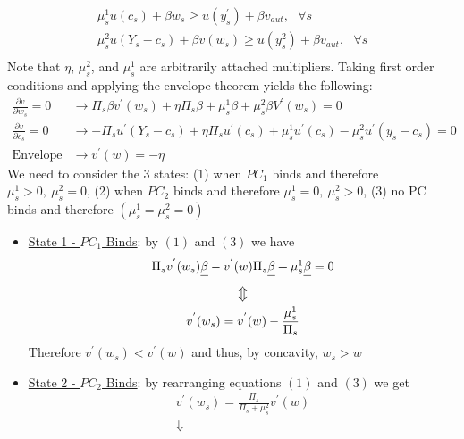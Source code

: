 \documentclass{article}
\begin{document}
\begin{itemize}
\begin{itemize}
\begin{itemize}
\begin{gather*}
                \mu_{s}^{1} u(c_{s}) + \beta w_{s} \geq u(y_{s}^{'}) + \beta v_{aut}, \ \ \ \forall s \\
                \mu_{s}^{2} u(Y_{s} - c_{s}) + \beta v(w_{s}) \geq u(y_{s}^{2}) + \beta v_{aut}, \ \ \ \forall s \\
            \end{gather*}
            Note that $\eta$, $\mu_{s}^{2}$, and $\mu_{s}^{1}$ are arbitrarily attached multipliers. Taking first order conditions and applying the envelope theorem yields the following:
            \begin{align*}
             \frac{\partial v}{\partial w_{s}} = 0 &\rightarrow \Pi_{s} \beta v^{'}(w_{s}) + \eta \Pi_{s} \beta + \mu_{s}^{1} \beta + \mu_{s}^{2} \beta V^{'}(w_{s}) = 0 \tag{1} \\
             \frac{\partial v}{\partial c_{s}} = 0 &\rightarrow - \Pi_{s}u^{'}(Y_{s} - c_{s}) + \eta \Pi_{s}u^{'}(c_{s}) + \mu_{s}^{1}u^{'}(c_{s}) - \mu_{s}^{2} u^{'}(y_{s} - c_{s}) = 0 \tag{2} \\
             \text{Envelope Theorem} &\rightarrow v^{'}(w) = -\eta \tag{3}
         \end{align*}
            We need to consider the 3 states: (1) when $PC_{1}$ binds and therefore $\mu_{s}^{1} > 0, \  \mu_{s}^{2} = 0$, (2) when $PC_{2}$ binds and therefore $\mu_{s}^{1} = 0, \ \mu_{s}^{2} > 0$, (3) no PC binds and therefore $(\mu_{s}^{1} = \mu_{s}^{2} = 0)$
            \begin{itemize}
                \item  \underline{State 1 - $PC_{1}$ Binds}: by $(1)$ and $(3)$ we have
                \begin{gather*}
                    \Pi_{s}v^{'}(w_{s}) \sout{\beta} - v^{'}(w) \Pi_{s} \sout{\beta} + \mu_{s}^{1} \sout{\beta} = 0 \\
                    \big\Updownarrow \\
                    v^{'}(w_{s}) = v^{'}(w) - \frac{\mu_{s}^{1}}{\Pi_{s}}
                \end{gather*}
                Therefore $v^{'}(w_{s}) < v^{'}(w)$ and thus, by concavity, $w_{s} > w$
                \item  \underline{State 2 - $PC_{2}$ Binds}: by rearranging equations $(1)$ and $(3)$ we get
                \begin{gather*}
                    v^{'}(w_{s}) = \frac{\Pi_{s}}{\Pi_{s} + \mu_{s}^{2}} v^{'}(w) \\
                    \Downarrow \\

\end{gather*}
\end{itemize}
\end{itemize}
\end{itemize}
\end{itemize}
\end{document}
